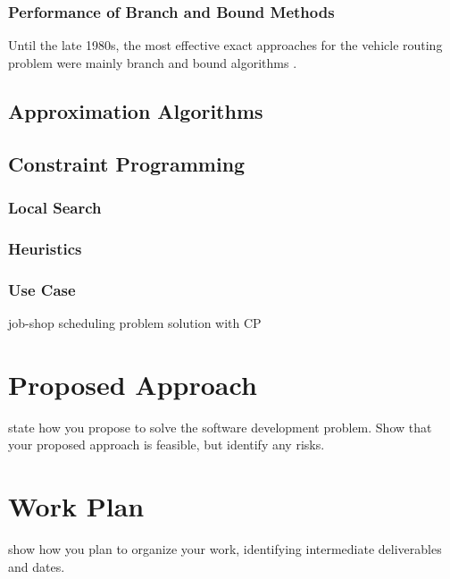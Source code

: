 \documentclass{mprop}
\theoremstyle{definition}
\begin{document}
\subsubsection{Performance of Branch and Bound Methods}
Until the late 1980s, the most effective exact approaches for the vehicle routing problem were mainly branch and bound algorithms \citep{vrpbible}.

\subsection{Approximation Algorithms}
\label{approxalgos}

\subsection{Constraint Programming}
\label{cp}
\subsubsection{Local Search}
\subsubsection{Heuristics}
\subsubsection{Use Case}
job-shop scheduling problem solution with CP

\section{Proposed Approach}

state how you propose to solve the software development problem. Show that your proposed approach is feasible, but identify any risks.

\section{Work Plan}

show how you plan to organize your work, identifying intermediate deliverables and dates.



\end{document}

